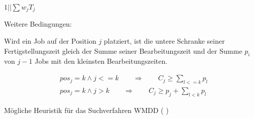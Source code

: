 \documentclass[hyperref={pdfpagelabels=false}]{beamer}
\begin{document}
\begin{frame}[allowframebreaks]{$1||\sum{w_jT_j}$}
\newpage
{\small
Weitere Bedingungen:

\vspace{10pt}
 Wird ein Job auf der Position $j$ platziert, ist die untere Schranke seiner Fertigstellungszeit gleich der Summe seiner Bearbeitungszeit und der Summe $p_i$ von $j-1$ Jobs mit den kleinsten Bearbeitungszeiten.
\begin{block}{}
\begin{align}
  & pos_j=k \wedge j<=k  \qquad \Rightarrow \qquad C_j \ge \sum_{l<=k} p_l \nonumber \\
  & pos_j=k \wedge j>k  \qquad \Rightarrow  \qquad C_j \ge p_j+\sum_{l<k} p_l \nonumber 
\end{align}
\end{block}
\vspace{8pt}
Mögliche Heuristik für das Suchverfahren WMDD ( \grqq)
}
\end{frame}
\end{document}
